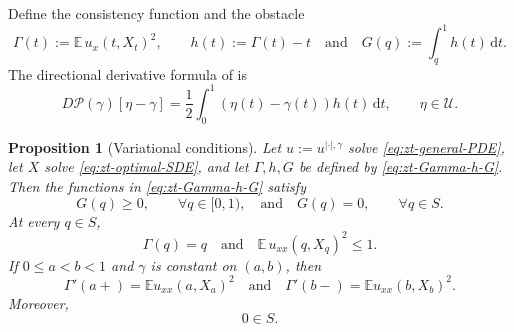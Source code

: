 \documentclass[10pt]{amsart}
\newtheorem{proposition}[proposition]{Proposition}
\theoremstyle{definition}
\theoremstyle{remark}
\numberwithin{equation}{section}
\newcommand{\E}{\mathbb E}
\newcommand{\1}{\mathbf 1}
\newcommand{\cU}{\mathcal U}
\newcommand{\cP}{\mathcal P}
\newcommand{\dd}{\,\mathrm d}
\begin{document}
Define the consistency function and the obstacle
\begin{equation}
 \Gamma(t):=\E\,u_x(t,X_t)^2,\qquad h(t):=\Gamma(t)-t
 \quad\text{and}\quad G(q):=\int_q^1h(t)\dd t.
 \label{eq:zt-Gamma-h-G}
\end{equation}
The directional derivative formula of \cite[Propositions 3 and 4]{ChenHandschyLerman} is
\begin{equation}
 D\cP(\gamma)[\eta-\gamma]
 =\frac12\int_0^1(\eta(t)-\gamma(t))h(t)\dd t,
 \qquad \eta\in\cU.
 \label{eq:zt-directional-derivative}
\end{equation}

\begin{proposition}[Variational conditions]
\label{prop:zt-variational-conditions}
Let $u:=u^{|\cdot|,\gamma}$ solve \eqref{eq:zt-general-PDE}, let $X$ solve \eqref{eq:zt-optimal-SDE}, and let $\Gamma,h,G$ be defined by \eqref{eq:zt-Gamma-h-G}. Then the functions in \eqref{eq:zt-Gamma-h-G} satisfy
\begin{equation}
 G(q)\geq0,\qquad \forall q\in[0,1),
 \quad\text{and}\quad
 G(q)=0,\qquad \forall q\in S.
 \label{eq:zt-G-nonnegative}
\end{equation}
At every $q\in S$,
\begin{equation}
 \Gamma(q)=q\quad\text{and}\quad
 \E\,u_{xx}(q,X_q)^2\leq1.
 \label{eq:zt-consistency-stability}
\end{equation}
If $0\leq a<b<1$ and $\gamma$ is constant on $(a,b)$, then
\begin{equation}
 \Gamma'(a+)=\E u_{xx}(a,X_a)^2
 \quad\text{and}\quad
 \Gamma'(b-)=\E u_{xx}(b,X_b)^2.
 \label{eq:zt-gap-endpoint-derivatives}
\end{equation}
Moreover,
\begin{equation*}
 0\in S.
\end{equation*}
\end{proposition}
\end{document}

